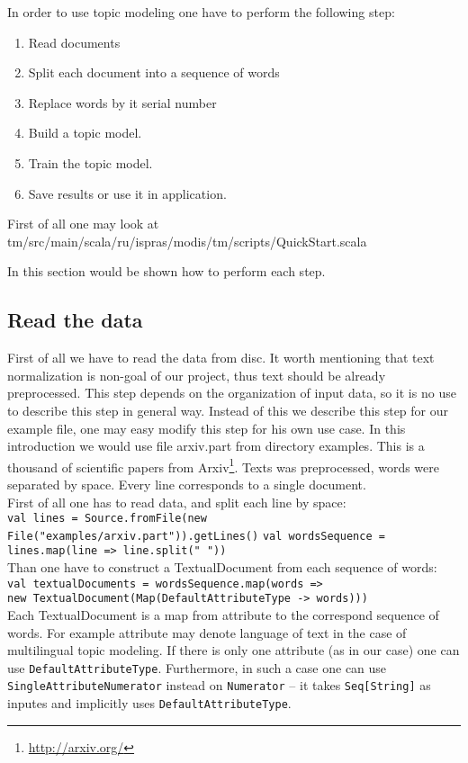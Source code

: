 In order to use topic modeling one have to perform the following step:
\begin{enumerate}
    \item Read documents
    \item Split each document into a sequence of words
    \item Replace words by it serial number
    \item Build a topic model.
    \item Train the topic model.
    \item Save results or use it in application. 
\end{enumerate}

First of all one may look at tm/src/main/scala/ru/ispras/modis/tm/scripts/QuickStart.scala

In this section would be shown how to perform each step. 
\subsection{Read the data}
    First of all we have to read the data from disc. It worth mentioning that text normalization is non\--goal of our project, thus text should be already preprocessed. 
    This step depends on the organization of input data, so it is
    no use to describe this step in general way. Instead of this we describe this step for our example file, one may easy modify this step for his own use case. %
    In this introduction we would use file arxiv.part from directory examples. This is a thousand of scientific  papers 
    from Arxiv\footnote{\url{http://arxiv.org/}}. Texts was preprocessed, words were separated by space. Every line corresponds
    to a single document.\\
    First of all one has to read data, and split each line by space:\\
    \texttt{val lines = Source.fromFile(new File("examples/arxiv.part")).getLines()}
    \texttt{val wordsSequence = lines.map(line => line.split(" "))}\\
    Than one have to construct a TextualDocument from each sequence of words:\\
    \texttt{val textualDocuments = wordsSequence.map(words => \\  new TextualDocument(Map(DefaultAttributeType -> words)))}\\
    Each TextualDocument is a map from attribute to the correspond sequence of words. For example attribute may denote language of
    text in the case of multilingual topic modeling. 
    If there is only one attribute (as in our case) one can use \texttt{DefaultAttributeType}.  Furthermore, in such a case one can use \texttt{SingleAttributeNumerator} instead on \texttt{Numerator} -- it takes \texttt{Seq[String]} as inputes and implicitly uses \texttt{DefaultAttributeType}.

